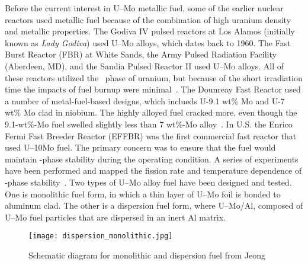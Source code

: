 Before the current interest in U--Mo metallic fuel, some of the earlier nuclear reactors used metallic fuel because of the combination of high uranium density and metallic properties. The Godiva IV pulsed reactors at Los Alamos (initially known as \textit{Lady Godiva}) used U--Mo alloys, which dates back to 1960. The Fast Burst Reactor (FBR) at White Sands, the Army Pulsed Radiation Facility (Aberdeen, MD), and the Sandia Pulsed Reactor II used U--Mo alloys. All of these reactors utilized the \textgamma~phase of uranium, but because of the short irradiation time the impacts of fuel burnup were minimal~\cite{horak1973operating}. The Dounreay Fast Reactor used a number of metal-fuel-based designs, which inclueds U-9.1 wt\% Mo and U-7 wt\% Mo clad in niobium. The highly alloyed fuel cracked more, even though the 9.1-wt\%-Mo fuel swelled slightly less than 7 wt\%-Mo alloy~\cite{cottrell1964development}. In U.S. the Enrico Fermi Fast Breeder Reactor (EFFBR) was the first commercial fast reactor that used U--10Mo fuel. The primary concern was to ensure that the fuel would maintain \textgamma-phase stability during the operating condition. A series of experiments have been performed and mapped the fission rate and temperature dependence of \textgamma-phase stability~\cite{no20031374}. Two types of U--Mo alloy fuel have been designed and tested. One is monolithic fuel form, in which a thin layer of U--Mo foil is bonded to aluminum clad. The other is a dispersion fuel form, where U--Mo/Al, composed of U--Mo fuel particles that are dispersed in an inert Al matrix.

\begin{figure}
\centering
\texttt{[image: dispersion\_monolithic.jpg]}
\caption[Schematic of monolithic and dispersion fuel]{Schematic diagram for monolithic and dispersion fuel from Jeong \etal~\cite{jeong2015mechanical}}
\end{figure}
 

